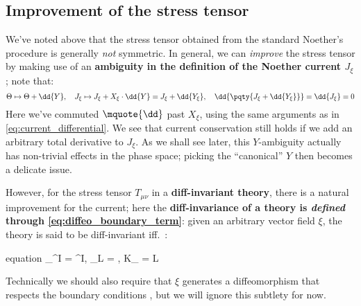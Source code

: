 \documentclass[a4paper
	,10pt
]{article}
\begin{document}
	
	
	
	
\subsection{Improvement of the stress tensor}
	We've noted above that the stress tensor obtained from the standard Noether's procedure is generally \textit{not} symmetric. In general, we can \textit{improve} the stress tensor by making use of an \textbf{ambiguity in the definition of the Noether current $J_\xi$}; note that:
	\begin{equation}
		\Theta \mapsto \Theta + \dd{Y},
	\quad
		J_\xi \mapsto J_\xi + X_\xi \cdot \dd{Y}
		= J_\xi + \dd{Y_\xi},
	\quad
		\dd{\pqty{
			J_\xi + \dd{Y_\xi}
		}} = \dd{J_\xi} = 0
	\end{equation}
	Here we've commuted $\mquote{\dd}$ past $X_\xi$, using the same arguments as in \eqref{eq:current_differential}. 
	We see that current conservation still holds if we add an arbitrary total derivative to $J_\xi$. 
	As we shall see later, this $Y$-ambiguity actually has non-trivial effects in the phase space; picking the ``canonical'' $Y$ then becomes a delicate issue. 
	
	However, for the stress tensor $T_{\mu\nu}$ in a \textbf{diff-invariant theory}, there is a natural improvement for the current; here the \textbf{diff-invariance of a theory is \textit{defined} through \eqref{eq:diffeo_boundary_term}}: given an arbitrary vector field $\xi$, the theory is said to be diff-invariant iff.~\cite{Harlow:2019yfa,Compere:2018aar}:
	\begin{empheq}{equation}
		\var_\xi \phi^I
		= \ldv{\xi} \phi^I,
	\quad
		\var_\xi L
		= ,
	\quad
		K_\xi
		= \xi \cdot L
	\end{empheq}
	Technically we should also require that $\xi$ generates a diffeomorphism that respects the boundary conditions \cite{Harlow:2019yfa}, but we will ignore this subtlety for now. 
	
\end{document}
